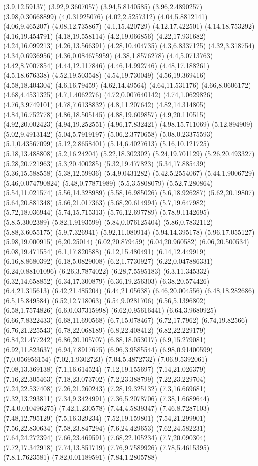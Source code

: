 (3.9,12.59137) (3.92,9.3607057) (3.94,5.8140585) (3.96,2.4890257) (3.98,0.30668899) (4,0.31925076) (4.02,2.5257312) (4.04,5.8812141) (4.06,9.465207) (4.08,12.735867) (4.1,15.420729) (4.12,17.422501) (4.14,18.753292) (4.16,19.454791) (4.18,19.558114) (4.2,19.066856) (4.22,17.931682) (4.24,16.099213) (4.26,13.566391) (4.28,10.404735) (4.3,6.8337125) (4.32,3.318754) (4.34,0.6936956) (4.36,0.084675959) (4.38,1.8576278) (4.4,5.0713763) (4.42,8.7007854) (4.44,12.117846) (4.46,14.992746) (4.48,17.188261) (4.5,18.676338) (4.52,19.503548) (4.54,19.730049) (4.56,19.369416) (4.58,18.404304) (4.6,16.79459) (4.62,14.49564) (4.64,11.531176) (4.66,8.0606172) (4.68,4.4531325) (4.7,1.4062276) (4.72,0.007640142) (4.74,1.0629826) (4.76,3.9749101) (4.78,7.6138832) (4.8,11.207642) (4.82,14.314805) (4.84,16.752778) (4.86,18.505145) (4.88,19.609857) (4.9,20.110515) (4.92,20.002423) (4.94,19.252551) (4.96,17.832421) (4.98,15.711069) (5,12.894909) (5.02,9.4913142) (5.04,5.7919197) (5.06,2.3770658) (5.08,0.23375593) (5.1,0.43567099) (5.12,2.8658401) (5.14,6.4027613) (5.16,10.121725) (5.18,13.488808) (5.2,16.24204) (5.22,18.302302) (5.24,19.701129) (5.26,20.493327) (5.28,20.721963) (5.3,20.400285) (5.32,19.477823) (5.34,17.885439) (5.36,15.588558) (5.38,12.59936) (5.4,9.0431282) (5.42,5.2554067) (5.44,1.9006729) (5.46,0.074790824) (5.48,0.77871989) (5.5,3.5808079) (5.52,7.280864) (5.54,11.021574) (5.56,14.328989) (5.58,16.985026) (5.6,18.926287) (5.62,20.19807) (5.64,20.881348) (5.66,21.017363) (5.68,20.614994) (5.7,19.647982) (5.72,18.036944) (5.74,15.715313) (5.76,12.697789) (5.78,9.1142695) (5.8,5.3002389) (5.82,1.9193599) (5.84,0.076125404) (5.86,0.7832112) (5.88,3.6055175) (5.9,7.326941) (5.92,11.080914) (5.94,14.395178) (5.96,17.055127) (5.98,19.000915) (6,20.25014) (6.02,20.879459) (6.04,20.960582) (6.06,20.500534) (6.08,19.471554) (6.1,17.820588) (6.12,15.480491) (6.14,12.449919) (6.16,8.8680392) (6.18,5.0829008) (6.2,1.7730927) (6.22,0.047886331) (6.24,0.88101096) (6.26,3.7874022) (6.28,7.5595183) (6.3,11.345332) (6.32,14.658852) (6.34,17.300879) (6.36,19.256303) (6.38,20.574426) (6.4,21.315613) (6.42,21.485204) (6.44,21.05638) (6.46,20.004556) (6.48,18.282686) (6.5,15.849584) (6.52,12.718063) (6.54,9.0281706) (6.56,5.1396802) (6.58,1.7574826) (6.6,0.037315998) (6.62,0.95616441) (6.64,3.9680925) (6.66,7.8322433) (6.68,11.690568) (6.7,15.078467) (6.72,17.7962) (6.74,19.82566) (6.76,21.225543) (6.78,22.068189) (6.8,22.408412) (6.82,22.229179) (6.84,21.477242) (6.86,20.105707) (6.88,18.053017) (6.9,15.279081) (6.92,11.823637) (6.94,7.8917675) (6.96,3.9585544) (6.98,0.91400599) (7,0.056956154) (7.02,1.9302723) (7.04,5.4872732) (7.06,9.5392061) (7.08,13.369138) (7.1,16.614524) (7.12,19.155697) (7.14,21.026379) (7.16,22.305463) (7.18,23.073702) (7.2,23.388799) (7.22,23.229704) (7.24,22.537408) (7.26,21.260243) (7.28,19.325132) (7.3,16.669681) (7.32,13.293811) (7.34,9.3424991) (7.36,5.2078706) (7.38,1.6689644) (7.4,0.010496275) (7.42,1.230578) (7.44,4.5839347) (7.46,8.7287103) (7.48,12.795129) (7.5,16.329234) (7.52,19.159801) (7.54,21.299901) (7.56,22.830634) (7.58,23.847294) (7.6,24.429653) (7.62,24.582231) (7.64,24.272394) (7.66,23.469591) (7.68,22.105234) (7.7,20.090304) (7.72,17.342918) (7.74,13.851719) (7.76,9.7589926) (7.78,5.4615395) (7.8,1.7623581) (7.82,0.01189591) (7.84,1.2805788) 